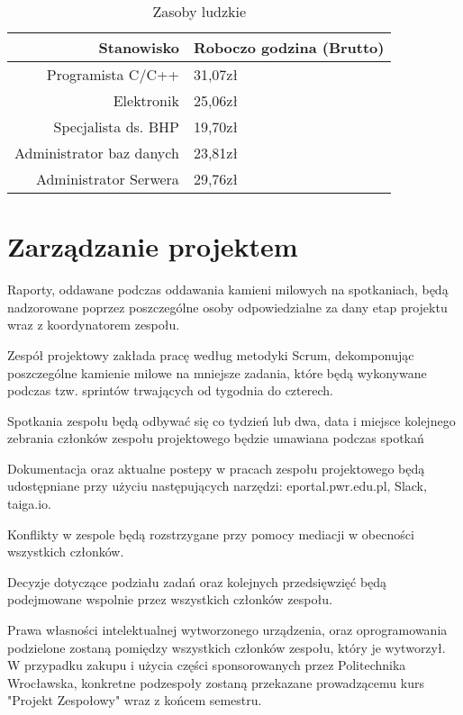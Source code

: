 \documentclass[10pt, a4paper]{article}
\begin{document}
\begin{table}[H]
		\centering
		\begin{tabular}{|r|l|} \hline
			\textbf{Stanowisko} & \textbf{Roboczo godzina (Brutto)} \\
			\hline
			Programista C/C++ & 31,07zł\\
			Elektronik & 25,06zł\\
			Specjalista ds. BHP& 19,70zł\\ 
			Administrator baz danych & 23,81zł\\
			Administrator Serwera & 29,76zł\\ 
			\hline
		\end{tabular}
		\caption{Zasoby ludzkie}
		\label{tab:Ludzie}
	\end{table}

\section{Zarządzanie projektem}
\begin{description}[font=$\bullet$~\normalfont]
\item Raporty, oddawane podczas oddawania kamieni milowych na spotkaniach, będą nadzorowane poprzez poszczególne osoby odpowiedzialne za dany etap projektu wraz z koordynatorem zespołu.
\item Zespół projektowy zakłada pracę według metodyki Scrum, dekomponując poszczególne kamienie milowe na mniejsze zadania, które będą wykonywane podczas tzw. sprintów trwających od tygodnia do czterech.
\item Spotkania zespołu będą odbywać się co tydzień lub dwa, data i miejsce kolejnego zebrania członków zespołu projektowego będzie umawiana podczas spotkań
\item Dokumentacja oraz aktualne postepy w pracach zespołu projektowego będą udostępniane przy użyciu następujących narzędzi: eportal.pwr.edu.pl, Slack, taiga.io.
\item Konflikty w zespole będą rozstrzygane przy pomocy mediacji w obecności wszystkich członków. \item Decyzje dotyczące podziału zadań oraz kolejnych przedsięwzięć będą podejmowane wspolnie przez wszystkich członków zespołu.
\item Prawa własności intelektualnej wytworzonego urządzenia, oraz oprogramowania podzielone zostaną pomiędzy wszystkich członków zespołu, który je wytworzył. W przypadku zakupu i użycia części sponsorowanych przez Politechnika Wrocławska, konkretne podzespoły zostaną przekazane prowadzącemu kurs "Projekt Zespołowy" wraz z końcem semestru.
\end{description}
\end{document}
